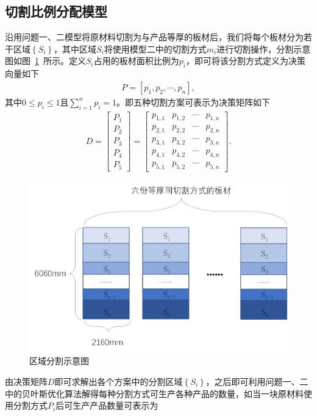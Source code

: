 \documentclass{whutmod}
\begin{document}
    		\subsection{切割比例分配模型}
    		沿用问题一、二模型将原材料切割为与产品等厚的板材后，我们将每个板材分为若干区域$\left \{ S_i \right \}$，其中区域$S_i$将使用模型二中的切割方式$m_i$进行切割操作，分割示意图如图~\ref{inoni}~所示。定义$S_i$占用的板材面积比例为$p_i$，即可将该分割方式定义为决策向量如下
    	\begin{gather*}
    	P=[p_1,p_2,\cdots,p_n] ,
    	\end{gather*}
    	其中$0\leqslant p_i\leqslant 1$且$\sum_{i=1}^n p_i=1$。即五种切割方案可表示为决策矩阵如下
    	\begin{gather}
    D=\begin{bmatrix}P_1
    \\ P_2
    \\ P_3
    \\ P_4
    \\ P_5
    \end{bmatrix}=\begin{bmatrix}
    p_{1,1}&  p_{1,2} & \cdots &p_{1,n} \\
    p_{2,1}&  p_{2,2} & \cdots &p_{2,n} \\
    p_{3,1}&  p_{3,2} & \cdots &p_{3,n} \\
    p_{4,1}&  p_{4,2} & \cdots &p_{4,n} \\
    p_{5,1}&  p_{5,2} & \cdots &p_{5,n} 
    \end{bmatrix}.
    	\end{gather}
    	  \begin{figure}[H]
    		\centering
    		\includegraphics[width=.7\textwidth]{figures/3.png}
    		\caption{区域分割示意图}\label{inoni}
    	\end{figure}
  由决策矩阵$D$即可求解出各个方案中的分割区域$\left \{ S_i \right \}$，之后即可利用问题一、二中的贝叶斯优化算法解得每种分割方式可生产各种产品的数量，如当一块原材料使用分割方式$P_i$后可生产产品数量可表示为
\end{document}
